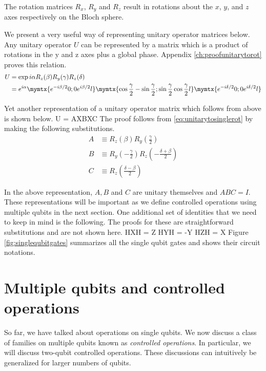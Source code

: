 The rotation matrices $R_x$, $R_y$ and $R_z$ result in rotations about the $x$, $y$, and $z$ axes respectively on the Bloch sphere. 

We present a very useful way of representing unitary operator matrices below. Any unitary operator $U$ can be represented by a matrix which is a product of rotations in the y and z axes plus a global phase. Appendix \ref{ch:proofunitarytorot} proves this relation.
\begin{align}
\label{eq:unitarytosinglerot}
U &= \exp{i\alpha}R_z(\beta)R_y(\gamma)R_z(\delta)\\ 
&= e^{i\alpha}\mymtx{e^{-i\beta/2} 0 ; 0 e^{i\beta/2}l}
\mymtx{\cos\frac{\gamma}{2} -\sin\frac{\gamma}{2} ; \sin\frac{\gamma}{2} \cos\frac{\gamma}{2}l} 
\mymtx{e^{-i\delta/2} 0 ; 0 e^{i\delta/2}l}
\end{align}

Yet another representation of a unitary operator matrix which follows from above is shown below.
\beq
U = AXBXC
\label{eq:unitarytosingle}
\eeq
The proof follows from \eqref{eq:unitarytosinglerot} by making the following substitutions.
\begin{align}
A &\equiv R_z\left(\beta\right)R_y\left(\frac{\gamma}{2}\right)\\
B &\equiv R_y\left(-\frac{\gamma}{2}\right)R_z\left(-\frac{\delta + \beta}{2}\right)\\
C &\equiv R_z\left(\frac{\delta - \beta}{2}\right)
\end{align}

In the above representation, $A,B$ and $C$ are unitary themselves and $ABC = I$.
These representations will be important as we define controlled operations using multiple qubits in the next section. One additional set of identities that we need to keep in mind is the following. The proofs for these are straightforward substitutions and are not shown here.
\beq
HXH = Z \text{ ; } HYH = -Y \text{ ; } HZH = X
\eeq
Figure \ref{fig:singlequbitgates} summarizes all the single qubit gates and shows their circuit notations.


\section{Multiple qubits and controlled operations}
So far, we have talked about operations on single qubits. We now discuss a class of families on multiple qubits known as \textit{controlled operations}. In particular, we will discuss two-qubit controlled operations. These discussions can intuitively be generalized for larger numbers of qubits.


